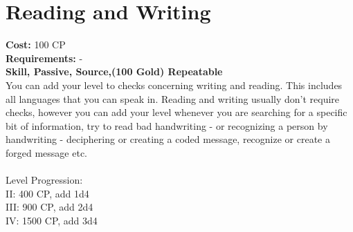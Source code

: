 \section{Reading and Writing}
\textbf{Cost:} 100 CP\\
\textbf{Requirements:} -\\
\textbf{Skill, Passive, Source,(100 Gold) Repeatable}\\
You can add your level to checks concerning writing and reading. This includes all languages that you can speak in. Reading and writing usually don't require checks, however you can add your level whenever you are searching for a specific bit of information, try to read bad handwriting - or recognizing a person by handwriting - deciphering or creating a coded message, recognize or create a forged message etc.\\
\\
Level Progression:\\
II: 400 CP, add 1d4\\
III: 900 CP, add 2d4\\
IV: 1500 CP, add 3d4\\